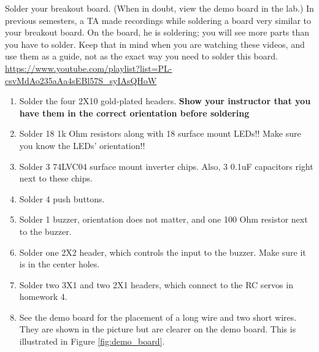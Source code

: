\documentclass[11pt]{article}
\begin{document}

Solder your breakout board. (When in doubt, view the demo board in the lab.)  In previous semesters, a TA made recordings while soldering a board very similar to your breakout board. On the board, he is soldering; you will see more parts than you have to solder. Keep that in mind when you are watching these videos, and use them as a guide, not as the exact way you need to solder this board.  \url{https://www.youtube.com/playlist?list=PL-csvMdAo235aAa4sEBl57S_syIAsQHoW}
%
\begin{enumerate}
    \item Solder the four 2X10 gold-plated headers. \textbf{Show your instructor that you have them in the correct orientation before soldering}
    \item Solder 18 1k Ohm resistors along with 18 surface mount LEDs!! Make sure you know the LEDs' orientation!!
    \item Solder 3 74LVC04 surface mount inverter chips. Also, 3 0.1uF capacitors right next to these chips.
    \item Solder 4 push buttons.
    \item Solder 1 buzzer, orientation does not matter, and one 100 Ohm resistor next to the buzzer.
    \item Solder one 2X2 header, which controls the input to the buzzer. Make sure it is in the center holes.
    \item Solder two 3X1 and two 2X1 headers, which connect to the RC servos in homework 4.
    \item See the demo board for the placement of a long wire and two short wires. They are shown in the picture but are clearer on the demo board. This is illustrated in Figure \ref{fig:demo_board}.
\end{enumerate}
%
\end{document}
